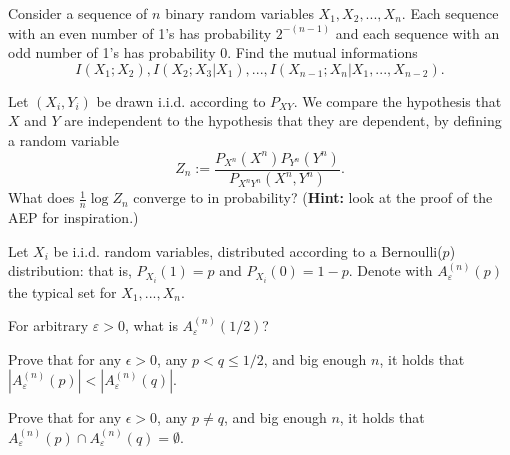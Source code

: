 \documentclass[a4paper,10pt,landscape,twocolumn]{scrartcl}
\begin{document}
\begin{exercise}
Consider a sequence of $n$ binary random variables $X_1, X_2, ..., X_n$.
Each sequence with an even number of 1's has probability $2^{-(n-1)}$ and each sequence with an odd number
of 1's has probability 0. Find the mutual informations
\[
I(X_1;X_2), I(X_2;X_3|X_1), ..., I(X_{n-1};X_n|X_1, ..., X_{n-2}).
\]
\end{exercise}
\vspace{-0.5cm}

\begin{exercise}[Independence?]
	Let $(X_i,Y_i)$ be drawn i.i.d. according to $P_{XY}$. We compare the hypothesis that $X$ and $Y$ are independent to the hypothesis that they are dependent, by defining a random variable
	\[
	Z_n := \frac{P_{X^n}({X^n})P_{Y^n}(Y^n)}{P_{X^nY^n}(X^n,Y^n)}.
	\]
	What does $\frac{1}{n} \log Z_n$ converge to in probability? (\textbf{Hint:} look at the proof of the AEP for inspiration.)
\end{exercise}

\begin{exercise}
	Let $X_i$ be i.i.d. random variables, distributed according to a Bernoulli($p$) distribution: that is, $P_{X_i}(1) = p$ and $P_{X_i}(0) = 1-p$. Denote with $A_{\varepsilon}^{(n)}(p)$ the typical set for $X_1, ..., X_n$.
	
	\begin{subex}
		For arbitrary $\varepsilon > 0$, what is $A_{\varepsilon}^{(n)}(1/2)$?
	\end{subex}
	\begin{subex}
		Prove that for any $\epsilon > 0$, any $p < q \leq 1/2$, and big enough $n$, it holds that $|A_{\varepsilon}^{(n)}(p)| < |A_{\varepsilon}^{(n)}(q)|$.
	\end{subex}
\begin{subex}
	Prove that for any $\epsilon > 0$, any $p \neq q$, and big enough $n$, it holds that $A_{\varepsilon}^{(n)}(p) \cap A_{\varepsilon}^{(n)}(q) = \emptyset$.
\end{subex}
\end{exercise}
\end{document}
